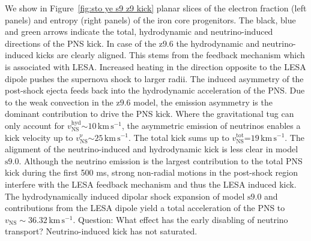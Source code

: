 \documentclass[fleqn,usenatbib]{mnras}
\newcommand{\kms}{\ensuremath{\mathrm{km\, s^{-1}}}}
\newcommand{\snine}{\ensuremath{\mathrm{s9.0}}\xspace}
\newcommand{\znine}{\ensuremath{\mathrm{z9.6}}\xspace}
\newcommand{\COM}[1]{{\color{orange}#1}}
\begin{document}
We show in Figure~\ref{fig:sto ye s9 z9 kick} planar slices of the electron fraction (left panels) and entropy (right panels) of the iron core progenitors. The black, blue and green arrows indicate the total, hydrodynamic and neutrino-induced directions of the PNS kick. In case of the \znine the hydrodynamic and neutrino-induced kicks are clearly aligned. This stems from the feedback mechanism which is associated with LESA. Increased heating in the direction opposite to the LESA dipole pushes the supernova shock to larger radii. The induced asymmetry of the post-shock ejecta feeds back into the hydrodynamic acceleration of the PNS. Due to the weak convection in the \znine model, the emission asymmetry is the dominant contribution to drive the PNS kick. 
Where the gravitational tug can only account for  $v_{\mathrm{NS}}^{\mathrm{hyd}}\mathord{\sim}10\,\kms$, the asymmetric emission of neutrinos enables a kick velocity up to $v_{\mathrm{NS}}^{\mathrm{\nu}}\mathord{\sim}25\,\kms$. The total kick sums up to $v_{\mathrm{NS}}^{\mathrm{tot}}\mathord{=}19\,\kms$.
The alignment of the neutrino-induced and hydrodynamic kick is less clear in model \snine. Although the neutrino emission is the largest contribution to the total PNS kick during the first 500 ms, strong non-radial motions in the post-shock region interfere with the LESA feedback mechanism and thus the LESA induced kick. 
The hydrodynamically induced dipolar shock expansion of model \snine and contributions from the LESA dipole yield a total acceleration of the PNS to $v_{\mathrm{NS}}\mathrm{\sim}36.32\,\kms$.
\COM{Question: What effect has the early disabling of neutrino transport? Neutrino-induced kick has not saturated. }
\end{document}
